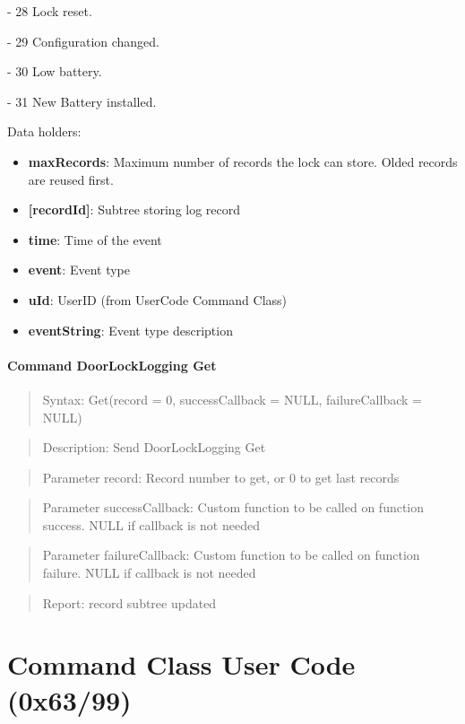 - 28 Lock reset. 

- 29 Configuration changed. 

- 30 Low battery. 

- 31 New Battery installed.
\newline

\noindent
Data holders:

\begin{itemize}
\item \textbf{maxRecords}: Maximum number of records the lock can store. Olded records are reused first.
\item \textbf{[recordId]}: Subtree storing log record
\item \qquad\textbf{time}: Time of the event
\item \qquad\textbf{event}: Event type
\item \qquad\textbf{uId}: UserID (from UserCode Command Class)
\item \qquad\textbf{eventString}: Event type description
\end{itemize}

\paragraph{Command DoorLockLogging Get}
\begin{quote}Syntax: Get(record = 0, successCallback = NULL, failureCallback = NULL)\end{quote}
\begin{quote}Description: Send DoorLockLogging Get\end{quote}
\begin{quote}Parameter record: Record number to get, or 0 to get last records\end{quote}
\begin{quote}Parameter successCallback: Custom function to be called on function success. NULL if callback is not needed\end{quote}
\begin{quote}Parameter failureCallback: Custom function to be called on function failure. NULL if callback is not needed\end{quote}
\begin{quote}Report: record subtree updated\end{quote}


\section{Command Class User Code (0x63/99)}

